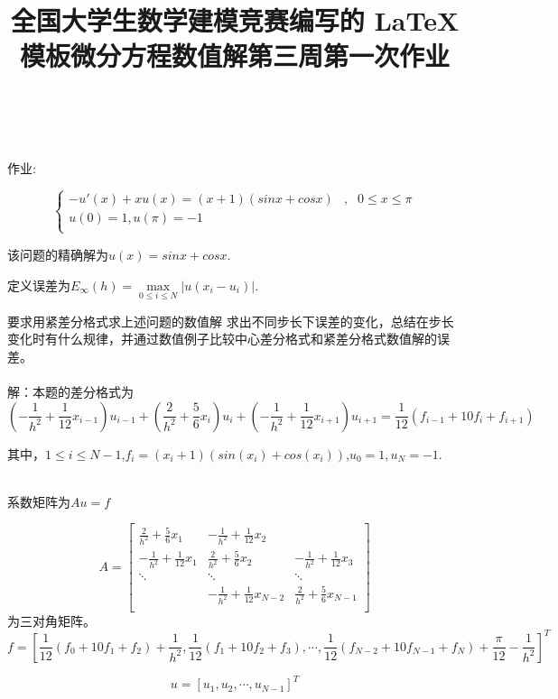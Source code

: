 \documentclass[withoutpreface,bwprint]{cumcmthesis} %
\title{全国大学生数学建模竞赛编写的 \LaTeX{} 模板}
\title{微分方程数值解第三周第一次作业}
\begin{document}
	\maketitle
	~\\
	~\\
	
	作业:
	
	$$
	\left\{
	\begin{array}{lcl}
	-u'(x)+xu(x)=(x+1)(sinx+cosx) &, &0 \leq x \leq \pi\\
	u(0)=1,u(\pi)=-1 \\
	\end{array}
	\right.
	$$
	
	该问题的精确解为$ u(x)=sinx+cosx $.
	
	定义误差为$ E_{\infty}(h)=\max \limits_{0 \leq i \leq N}|u(x_{i}-u_i)| $.
	
	要求用紧差分格式求上述问题的数值解 求出不同步长下误差的变化，总结在步长变化时有什么规律，并通过数值例子比较中心差分格式和紧差分格式数值解的误差。
	~\\
	~\\
	解：本题的差分格式为
	\[  (-\dfrac{1}{h^{2}} +\dfrac{1}{12} x_{i-1})u_{i-1}+(\dfrac{2}{h^{2}}+\dfrac{5}{6}x_{i})u_{i}+(-\dfrac{1}{h^{2}} +\dfrac{1}{12} x_{i+1})u_{i+1}=\dfrac{1}{12}(f_{i-1}+10f_{i}+f_{i+1})\]
	
	其中，$ 1 \leq i \leq N-1 $,$ f_{i}=(x_{i}+1)(sin(x_{i})+cos(x_{i})) $,$ u_{0}=1,u_{N}=-1 $.
	
	
	
	
	
	~\\
	系数矩阵为$ Au=f $
	
	$$
	A=
	\begin{bmatrix}
	\frac{2}{h^{2}}+\frac{5}{6}x_{1}  & -\frac{1}{h^{2}}+\frac{1}{12}x_{2}  \\
	-\frac{1}{h^{2}}+\frac{1}{12}x_{1} & \frac{2}{h^{2}}+\frac{5}{6}x_{2} &-\frac{1}{h^{2}}+\frac{1}{12}x_{3} \\
	\ddots & \ddots  &  \ddots \\
	&  -\frac{1}{h^{2}}+\frac{1}{12}x_{N-2} & \frac{2}{h^{2}}+\frac{5}{6}x_{N-1}\\
	\end{bmatrix}
	$$ 
	为三对角矩阵。
	$$
	f=
	[\dfrac{1}{12}(f_{0}+10f_{1}+f_{2})+\dfrac{1}{h^{2}},\dfrac{1}{12}(f_{1}+10f_{2}+f_{3}),\cdots,\dfrac{1}{12}(f_{N-2}+10f_{N-1}+f_{N})+\dfrac{\pi}{12}-\dfrac{1}{h^{2}}]^{T}
	$$
	
	$$u=[u_{1},u_{2},\cdots,u_{N-1}]^{T}$$
	
\end{document}
